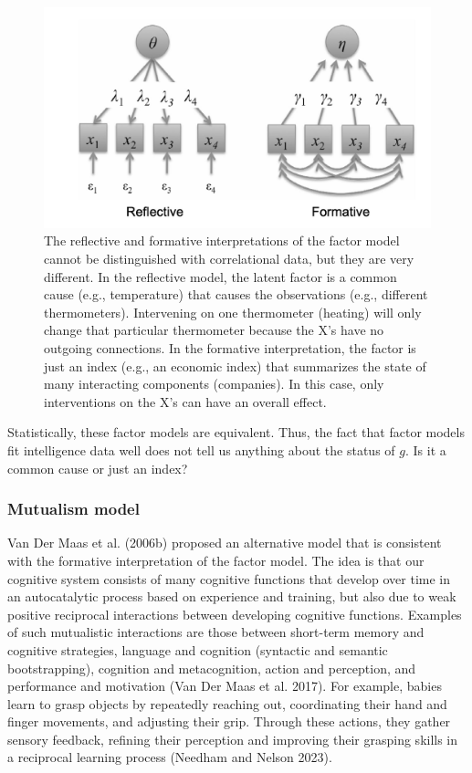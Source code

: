 \documentclass[
  a4paper,
  DIV=11,
  numbers=noendperiod,
  oneside]{scrreprt}
\begin{document}
\begin{figure}

{\centering \includegraphics{media/ch6/image5.jpg}

}

\caption{\label{fig-ch6-img5-old-74}The reflective and formative
interpretations of the factor model cannot be distinguished with
correlational data, but they are very different. In the reflective
model, the latent factor is a common cause (e.g., temperature) that
causes the observations (e.g., different thermometers). Intervening on
one thermometer (heating) will only change that particular thermometer
because the X's have no outgoing connections. In the formative
interpretation, the factor is just an index (e.g., an economic index)
that summarizes the state of many interacting components (companies). In
this case, only interventions on the X's can have an overall effect.}

\end{figure}

Statistically, these factor models are equivalent. Thus, the fact that
factor models fit intelligence data well does not tell us anything about
the status of \(g\). Is it a common cause or just an index?

\hypertarget{sec-Mutualism-model}{%
\subsubsection{Mutualism model}\label{sec-Mutualism-model}}

Van Der Maas et al. (2006b) proposed an alternative model that is
consistent with the formative interpretation of the factor model. The
idea is that our cognitive system consists of many cognitive functions
that develop over time in an autocatalytic process based on experience
and training, but also due to weak positive reciprocal interactions
between developing cognitive functions. Examples of such mutualistic
interactions are those between short-term memory and cognitive
strategies, language and cognition (syntactic and semantic
bootstrapping), cognition and metacognition, action and perception, and
performance and motivation (Van Der Maas et al. 2017). For example,
babies learn to grasp objects by repeatedly reaching out, coordinating
their hand and finger movements, and adjusting their grip. Through these
actions, they gather sensory feedback, refining their perception and
improving their grasping skills in a reciprocal learning process
(Needham and Nelson 2023).
\end{document}

